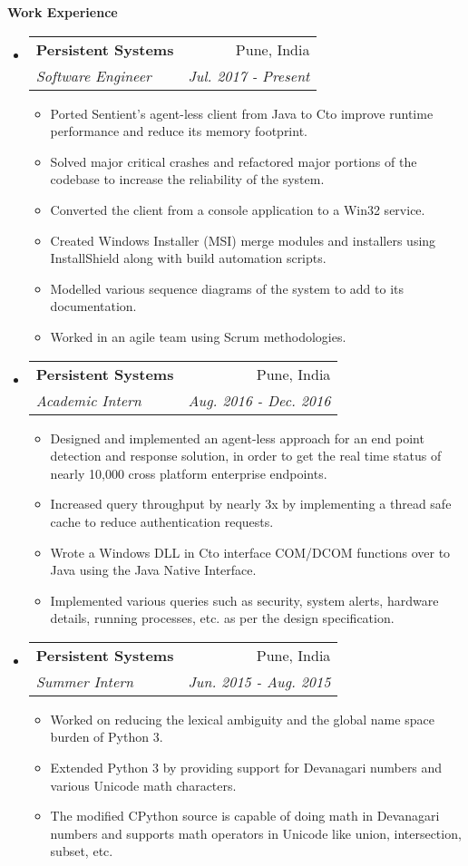 \documentclass[letterpaper,12pt]{article}
\makeatletter
\def\CC{{C\nolinebreak[4]\hspace{-.05em}\raisebox{.4ex}{\tiny\bf ++ }}}
\newcommand{\resitem}[1]{\item #1 \vspace{-2pt}}
\newcommand{\resheading}[1]{{\large \colorbox{mygrey}{\begin{minipage}{\textwidth}{\textbf{#1 \vphantom{p\^{E}}}}\end{minipage}}}}
\newcommand{\ressubheading}[4]{
    \begin{tabular*}{7.0in}{l@{\extracolsep{\fill}}r}
      \textbf{#1} & #2 \\
      \textit{#3} & \textit{#4} \\
    \end{tabular*}\vspace{-6pt}}
\makeatother
\begin{document}
  \resheading{Work Experience}
  \begin{itemize}
  \item
    \ressubheading{Persistent Systems}{Pune, India}{Software Engineer}{Jul. 2017 - Present}
    \begin{itemize}
      \resitem{Ported Sentient's agent-less client from Java to \CC to improve runtime performance and reduce its memory footprint.}
      \resitem{Solved major critical crashes and refactored major portions of the codebase to increase the reliability of the system.}
      \resitem{Converted the client from a console application to a Win32 service.}
      \resitem{Created Windows Installer (MSI) merge modules and installers using InstallShield along with build automation scripts.}
      \resitem{Modelled various sequence diagrams of the system to add to its documentation.}
      \resitem{Worked in an agile team using Scrum methodologies.}
    \end{itemize}
  \item
    \ressubheading{Persistent Systems}{Pune, India}{Academic Intern}{Aug. 2016 - Dec. 2016}
    \begin{itemize}
      \resitem{Designed and implemented an agent-less approach for an end point detection and response solution, in order to get the real time status of nearly 10,000 cross platform enterprise endpoints.}
      \resitem{Increased query throughput by nearly 3x by implementing a thread safe cache to reduce authentication requests.}
      \resitem{Wrote a Windows DLL in \CC to interface COM/DCOM functions over to Java using the Java Native Interface.}
      \resitem{Implemented various queries such as security, system alerts, hardware details, running processes, etc. as per the design specification.}
    \end{itemize}
  \item
    \ressubheading{Persistent Systems}{Pune, India}{Summer Intern}{Jun. 2015 - Aug. 2015}
    \begin{itemize}
      \resitem{Worked on reducing the lexical ambiguity and the global name space burden of Python 3.}
      \resitem{Extended Python 3 by providing support for Devanagari numbers and various Unicode math characters.}
      \resitem{The modified CPython source is capable of doing math in Devanagari numbers and supports math operators in Unicode like union, intersection, subset, etc.}
    \end{itemize}
  \end{itemize}
  
\end{document}

